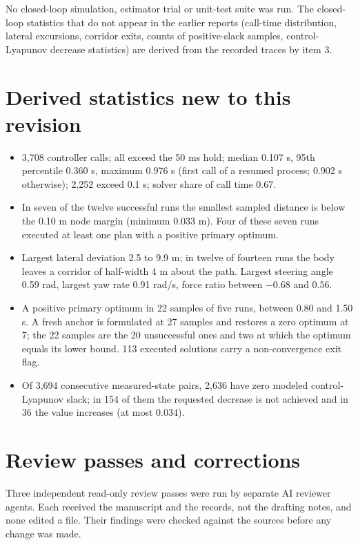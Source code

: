 \documentclass[11pt]{article}
\begin{document}
No closed-loop simulation, estimator trial or unit-test suite was run. The
closed-loop statistics that do not appear in the earlier reports (call-time
distribution, lateral excursions, corridor exits, counts of positive-slack
samples, control-Lyapunov decrease statistics) are derived from the recorded
traces by item 3.

\section{Derived statistics new to this revision}
\begin{itemize}
\item 3,708 controller calls; all exceed the 50 ms hold; median 0.107 s,
95th percentile 0.360 s, maximum 0.976 s (first call of a resumed process;
0.902 s otherwise); 2,252 exceed 0.1 s; solver share of call time 0.67.
\item In seven of the twelve successful runs the smallest sampled distance
is below the 0.10 m node margin (minimum 0.033 m). Four of these seven
runs executed at least one plan with a positive primary optimum.
\item Largest lateral deviation 2.5 to 9.9 m; in twelve of fourteen runs
the body leaves a corridor of half-width 4 m about the path. Largest
steering angle 0.59 rad, largest yaw rate 0.91 rad/s, force ratio between
$-0.68$ and $0.56$.
\item A positive primary optimum in 22 samples of five runs, between 0.80
and 1.50 s. A fresh anchor is formulated at 27 samples and restores a zero
optimum at 7; the 22 samples are the 20 unsuccessful ones and two at which
the optimum equals its lower bound. 113 executed solutions carry a
non-convergence exit flag.
\item Of 3,694 consecutive measured-state pairs, 2,636 have zero modeled
control-Lyapunov slack; in 154 of them the requested decrease is not
achieved and in 36 the value increases (at most 0.034).
\end{itemize}

\section{Review passes and corrections}
Three independent read-only review passes were run by separate AI reviewer
agents. Each received the manuscript and the records, not the drafting
notes, and none edited a file. Their findings were checked against the
sources before any change was made.
\end{document}
